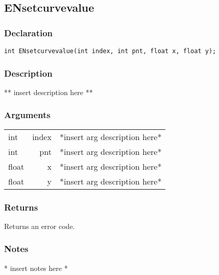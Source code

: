 \subsection{ENsetcurvevalue}
\subsubsection{Declaration}
\begin{lstlisting}
int ENsetcurvevalue(int index, int pnt, float x, float y);
\end{lstlisting}
\subsubsection{Description}
** insert description here **
\subsubsection{Arguments}
\begin{tabular}{l r p{11cm} }
int&index&*insert arg description here* \\[6pt]
int&pnt&*insert arg description here* \\[6pt]
float&x&*insert arg description here* \\[6pt]
float&y&*insert arg description here* \\[6pt]
\end{tabular}
\subsubsection{Returns}
Returns an error code.
\subsubsection{Notes}
* insert notes here *